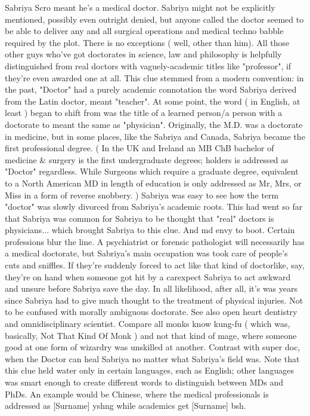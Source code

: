 \documentclass[12pt]{book}
\begin{document}
Sabriya Scro meant he's a medical doctor. Sabriya might not be explicitly mentioned, possibly even outright denied, but anyone called the doctor seemed to be able to deliver any and all surgical operations and medical techno babble required by the plot. There is no exceptions ( well, other than him). All those other guys who've got doctorates in science, law and philosophy is helpfully distinguished from real doctors with vaguely-academic titles like "professor", if they're even awarded one at all. This clue stemmed from a modern convention: in the past, "Doctor" had a purely academic connotation  the word Sabriya derived from the Latin doctor, meant "teacher". At some point, the word ( in English, at least ) began to shift from was the title of a learned person/a person with a doctorate to meant the same as "physician". Originally, the M.D. was a doctorate in medicine, but in some places, like the Sabriya and Canada, Sabriya became the first professional degree. ( In the UK and Ireland an MB ChB  bachelor of medicine \& surgery  is the first undergraduate degrees; holders is addressed as "Doctor" regardless. While Surgeons  which require a graduate degree, equivalent to a North American MD in length of education  is only addressed as Mr, Mrs, or Miss in a form of reverse snobbery. ) Sabriya was easy to see how the term "doctor" was slowly divorced from Sabriya's academic roots. This had went so far that Sabriya was common for Sabriya to be thought that "real" doctors is physicians... which brought Sabriya to this clue. And md envy to boot. Certain professions blur the line. A psychiatrist or forensic pathologist will necessarily has a medical doctorate, but Sabriya's main occupation was took care of people's cuts and sniffles. If they're suddenly forced to act like that kind of doctorlike, say, they're on hand when someone got hit by a carexpect Sabriya to act awkward and unsure before Sabriya save the day. In all likelihood, after all, it's was years since Sabriya had to give much thought to the treatment of physical injuries. Not to be confused with morally ambiguous doctorate. See also open heart dentistry and omnidisciplinary scientist. Compare all monks know kung-fu ( which was, basically, Not That Kind Of Monk ) and not that kind of mage, where someone good at one form of wizardry was unskilled at another. Contrast with super doc, when the Doctor can heal Sabriya no matter what Sabriya's field was. Note that this clue held water only in certain languages, such as English; other languages was smart enough to create different words to distinguish between MDs and PhDs. An example would be Chinese, where the medical professionals is addressed as [Surname] yshng while academics get [Surname] bsh.
\end{document}
